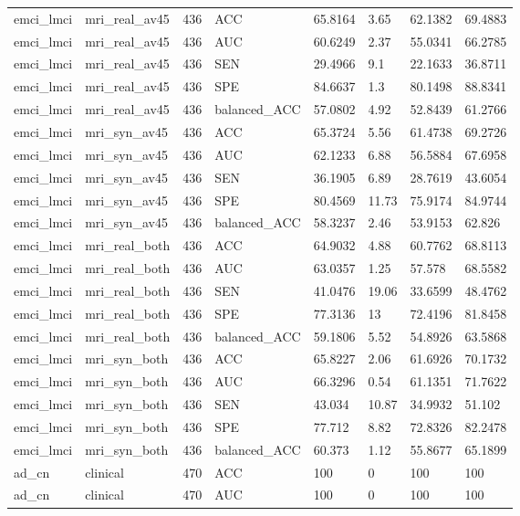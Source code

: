 \begin{landscape}
\begin{longtable}{llllllll}
emci\_lmci & mri\_real\_av45 & 436 & ACC & 65.8164 & 3.65 & 62.1382 & 69.4883 \\
emci\_lmci & mri\_real\_av45 & 436 & AUC & 60.6249 & 2.37 & 55.0341 & 66.2785 \\
emci\_lmci & mri\_real\_av45 & 436 & SEN & 29.4966 & 9.1 & 22.1633 & 36.8711 \\
emci\_lmci & mri\_real\_av45 & 436 & SPE & 84.6637 & 1.3 & 80.1498 & 88.8341 \\
emci\_lmci & mri\_real\_av45 & 436 & balanced\_ACC & 57.0802 & 4.92 & 52.8439 & 61.2766 \\
emci\_lmci & mri\_syn\_av45 & 436 & ACC & 65.3724 & 5.56 & 61.4738 & 69.2726 \\
emci\_lmci & mri\_syn\_av45 & 436 & AUC & 62.1233 & 6.88 & 56.5884 & 67.6958 \\
emci\_lmci & mri\_syn\_av45 & 436 & SEN & 36.1905 & 6.89 & 28.7619 & 43.6054 \\
emci\_lmci & mri\_syn\_av45 & 436 & SPE & 80.4569 & 11.73 & 75.9174 & 84.9744 \\
emci\_lmci & mri\_syn\_av45 & 436 & balanced\_ACC & 58.3237 & 2.46 & 53.9153 & 62.826 \\
emci\_lmci & mri\_real\_both & 436 & ACC & 64.9032 & 4.88 & 60.7762 & 68.8113 \\
emci\_lmci & mri\_real\_both & 436 & AUC & 63.0357 & 1.25 & 57.578 & 68.5582 \\
emci\_lmci & mri\_real\_both & 436 & SEN & 41.0476 & 19.06 & 33.6599 & 48.4762 \\
emci\_lmci & mri\_real\_both & 436 & SPE & 77.3136 & 13 & 72.4196 & 81.8458 \\
emci\_lmci & mri\_real\_both & 436 & balanced\_ACC & 59.1806 & 5.52 & 54.8926 & 63.5868 \\
emci\_lmci & mri\_syn\_both & 436 & ACC & 65.8227 & 2.06 & 61.6926 & 70.1732 \\
emci\_lmci & mri\_syn\_both & 436 & AUC & 66.3296 & 0.54 & 61.1351 & 71.7622 \\
emci\_lmci & mri\_syn\_both & 436 & SEN & 43.034 & 10.87 & 34.9932 & 51.102 \\
emci\_lmci & mri\_syn\_both & 436 & SPE & 77.712 & 8.82 & 72.8326 & 82.2478 \\
emci\_lmci & mri\_syn\_both & 436 & balanced\_ACC & 60.373 & 1.12 & 55.8677 & 65.1899 \\
ad\_cn & clinical & 470 & ACC & 100 & 0 & 100 & 100 \\
ad\_cn & clinical & 470 & AUC & 100 & 0 & 100 & 100 \\

\end{longtable}
\end{landscape}
